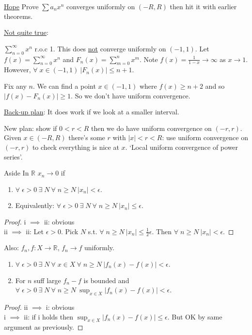     \underline{Hope} Prove $\sum a_n x^n$ converges uniformly on $(-R, R)$ then hit it with earlier theorems.

    \underline{Not quite true}:
    \begin{example}
        $\sum_{n=0}^{\infty} x^n$ r.o.c 1.
        This does \underline{not} converge uniformly on $(-1, 1)$.
        Let $f(x) = \sum_{n=0}^{\infty} x^n$ and $F_n(x) = \sum_{m=0}^{n} x^m$.
        Note $f(x) = \frac{1}{1 - x} \to \infty$ as $x \to 1$.
        However, $\forall \; x \in (-1, 1) \ |F_n(x)| \leq n + 1$.

        Fix any $n$.
        We can find a point $x \in (-1, 1)$ where $f(x) \geq n + 2$ and so $|f(x) - F_n(x)| \geq 1$.
        So we don't have uniform convergence. 
    \end{example} 

    \underline{Back-up plan}: It does work if we look at a smaller interval.
    
    New plan: show if $0 < r < R$ then we do have uniform convergence on $(-r, r)$. \\
    Given $x \in (-R, R)$ there's some $r$ with $|x| < r < R$: use uniform convergence on $(-r, r)$ to check everything is nice at $x$.
    `Local uniform convergence of power series'.

    \begin{aside}{Aside}
        In $\mathbb{R}$ $x_n \to 0$ if 
        \begin{enumerate}
            \item $\forall \; \epsilon > 0 \ \exists \; N \ \forall \; n \geq N \ |x_n| < \epsilon$.
            \item Equivalently: $\forall \; \epsilon > 0 \ \exists \; N \ \forall \; n \geq N \ |x_n| \leq \epsilon$.
        \end{enumerate} 
        \begin{proof}
            i $\implies$ ii: obvious \\
            ii $\implies$ ii: Let $\epsilon > 0$.
            Pick $N$ s.t. $\forall \; n \geq N \ |x_n|  \leq \frac{1}{2} \epsilon$.
            Then $\forall \; n \geq N \ |x_n| < \epsilon$.
        \end{proof} 


        Also: $f_n,f : X \to \mathbb{R}$, $f_n \to f$ uniformly.
        \begin{enumerate}
            \item $\forall \; \epsilon > 0\ \exists \; N\ \forall \; x \in X\ \forall \; n \geq N\ |f_n(x) - f(x)| < \epsilon$.
            \item For $n$ suff large $f_n - f$ is bounded and $\forall \; \epsilon > 0\ \exists \; N\ \forall \; n \geq N\ \sup_{x \in X} |f_n(x) - f(x)| < \epsilon$. 
        \end{enumerate} 
        \begin{proof}
            ii $\implies$ i: obvious \\
            i $\implies$ ii: if i holds then $\sup_{x \in X} |f_n(x) - f(x)| \leq \epsilon$.
            But OK by same argument as previously.
        \end{proof} 
    \end{aside} 

